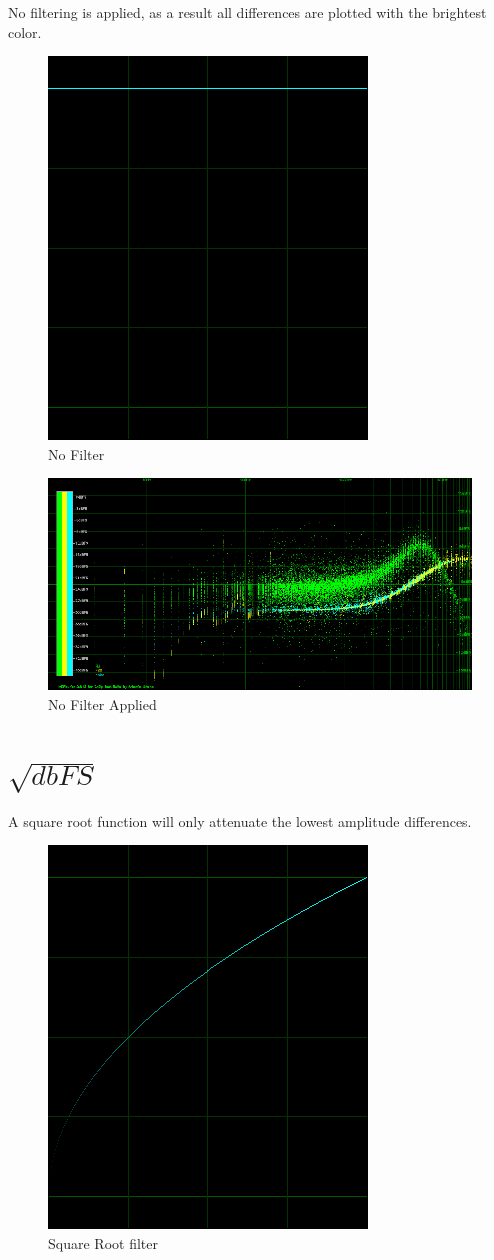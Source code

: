\documentclass[10pt,a4paper]{report}
\begin{document}
\begin{appendices}
No filtering is applied, as a result all differences are plotted with the brightest color. 

\begin{figure}[H]
	\centering
	\includegraphics[width=0.4\linewidth]{plots/BetaFunctionPlot_0.png}
	\caption[No Filter]{No Filter}
	\label{fig:betafunctionplot0}
\end{figure}

\begin{figure}[H]
	\centering
	\includegraphics[width=1\linewidth]{plots/BetaFunctionPlot_0_Data.png}
	\caption[No Filter]{No Filter Applied}
	\label{fig:betafunctionplot0data}
\end{figure}

\newpage
\section{$\sqrt{dbFS}$} 

A square root function will only attenuate the lowest amplitude differences.

\begin{figure}[H]
	\centering
	\includegraphics[width=0.4\linewidth]{plots/BetaFunctionPlot_1.png}
	\caption[Square Root filter]{Square Root filter}
	\label{fig:betafunctionplot1}
\end{figure}


\end{appendices}
\end{document}

